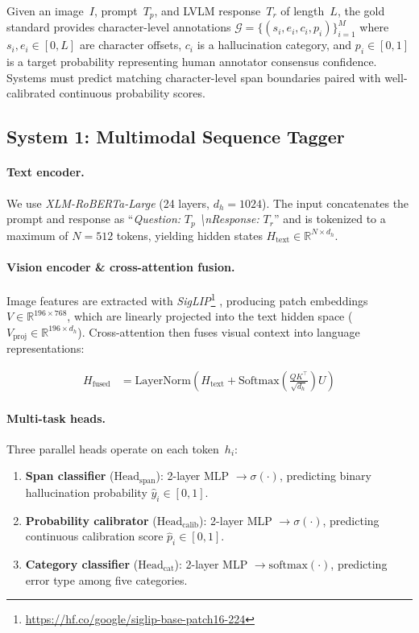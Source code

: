 \documentclass[11pt]{article}
\begin{document}
Given an image~$I$, prompt~$T_p$, and LVLM response~$T_r$ of length~$L$, the gold standard provides character-level annotations $\mathcal{G} = \{(s_i, e_i, c_i, p_i)\}_{i=1}^{M}$ where $s_i,e_i \in [0,L]$ are character offsets, $c_i$ is a hallucination category, and $p_i \in [0,1]$ is a target probability representing human annotator consensus confidence. Systems must predict matching character-level span boundaries paired with well-calibrated continuous probability scores.

\subsection{System 1: Multimodal Sequence Tagger}

\paragraph{Text encoder.}
We use \textit{XLM-RoBERTa-Large} \citep{conneau2020xlmroberta} (24 layers, $d_h\!=\!1024$). The input concatenates the prompt and response as ``\textit{Question:} $T_p$ \textit{\textbackslash nResponse:} $T_r$'' and is tokenized to a maximum of $N\!=\!512$ tokens, yielding hidden states $H_{\text{text}} \in \mathbb{R}^{N \times d_h}$.

\paragraph{Vision encoder \& cross-attention fusion.}
Image features are extracted with \textit{SigLIP}\footnote{\scriptsize\url{https://hf.co/google/siglip-base-patch16-224}} \citep{zhai2023siglip}, producing patch embeddings $V \in \mathbb{R}^{196 \times 768}$, which are linearly projected into the text hidden space ($V_{\text{proj}} \in \mathbb{R}^{196 \times d_h}$). Cross-attention then fuses visual context into language representations:

\begin{align}
    H_{\text{fused}} &= \mathrm{LayerNorm}\!\left(H_{\text{text}} + \mathrm{Softmax}\!\left(\tfrac{QK^\top}{\sqrt{d_h}}\right) U\right)
\end{align}

\paragraph{Multi-task heads.}
Three parallel heads operate on each token~$h_i$:
\begin{enumerate}[noitemsep,leftmargin=*]
    \item \textbf{Span classifier} ($\mathrm{Head}_{\text{span}}$): 2-layer MLP $\rightarrow \sigma(\cdot)$, predicting binary hallucination probability $\hat{y}_i \in [0,1]$.
    \item \textbf{Probability calibrator} ($\mathrm{Head}_{\text{calib}}$): 2-layer MLP $\rightarrow \sigma(\cdot)$, predicting continuous calibration score $\hat{p}_i \in [0,1]$.
    \item \textbf{Category classifier} ($\mathrm{Head}_{\text{cat}}$): 2-layer MLP $\rightarrow \mathrm{softmax}(\cdot)$, predicting error type among five categories.
\end{enumerate}
\end{document}
